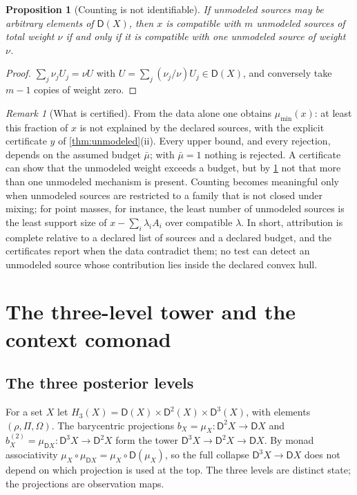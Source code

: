 \documentclass[11pt]{article}
\newtheorem{proposition}[theorem]{Proposition}
\theoremstyle{definition}
\theoremstyle{remark}
\newtheorem{remark}[theorem]{Remark}
\newcommand{\D}{\mathsf{D}}
\begin{document}
\begin{proposition}[Counting is not identifiable]\label{prop:counting}
If unmodeled sources may be arbitrary elements of $\D(X)$, then $x$ is compatible with $m$ unmodeled
sources of total weight $\nu$ if and only if it is compatible with one unmodeled source of weight $\nu$.
\end{proposition}
\begin{proof}
$\sum_j\nu_jU_j=\nu U$ with $U=\sum_j(\nu_j/\nu)U_j\in\D(X)$, and conversely take $m-1$ copies of weight
zero.
\end{proof}

\begin{remark}[What is certified]
From the data alone one obtains $\mu_{\min}(x)$: at least this fraction of $x$ is not explained by the
declared sources, with the explicit certificate $y$ of \cref{thm:unmodeled}(ii). Every upper bound, and
every rejection, depends on the assumed budget $\bar\mu$; with $\bar\mu=1$ nothing is rejected. A
certificate can show that the unmodeled weight exceeds a budget, but by \cref{prop:counting} not that
more than one unmodeled mechanism is present. Counting becomes meaningful only when unmodeled
sources are restricted to a family that is not closed under mixing; for point masses, for instance,
the least number of unmodeled sources is the least support size of $x-\sum_i\lambda_iA_i$ over
compatible $\lambda$. In short, attribution is complete relative to a declared list of sources and a
declared budget, and the certificates report when the data contradict them; no test can detect an
unmodeled source whose contribution lies inside the declared convex hull.
\end{remark}

\section{The three-level tower and the context comonad}

\subsection{The three posterior levels}

For a set $X$ let $H_3(X)=\D(X)\times\D^2(X)\times\D^3(X)$, with elements $(\rho,\Pi,\Omega)$. The
barycentric projections $b_X=\mu_X\colon\D^2X\to\D X$ and $b^{(2)}_X=\mu_{\D X}\colon\D^3X\to\D^2X$
form the tower $\D^3X\to\D^2X\to\D X$. By monad associativity
$\mu_X\circ\mu_{\D X}=\mu_X\circ\D(\mu_X)$, so the full collapse $\D^3X\to\D X$ does not depend on
which projection is used at the top. The three levels are distinct state; the projections are
observation maps.
\end{document}
